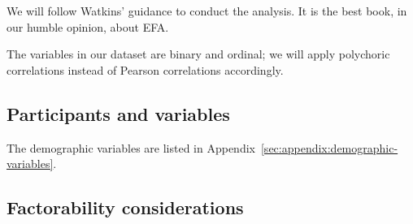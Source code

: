 \documentclass[10pt,conference]{IEEEtran}\usepackage[]{graphicx}\usepackage[table,xcdraw]{xcolor}
\begin{document}
We will follow Watkins' guidance \cite[pp. 33]{watkins2020step} to conduct the analysis. It is the best book, in our humble opinion, about EFA. 

The variables in our dataset are binary and ordinal; we will apply polychoric correlations instead of Pearson correlations accordingly.

\subsection{Participants and variables}

The demographic variables are listed in Appendix~\ref{sec:appendix:demographic-variables}.

\subsection{Factorability considerations}
\end{document}
